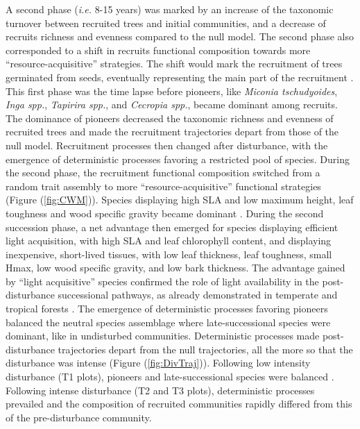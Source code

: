 \documentclass[fleqn,10pt]{ArtEcoFoG} %
\begin{document}
A second phase (\emph{i.e.} 8-15 years) was marked by an increase of the
taxonomic turnover between recruited trees and initial communities, and
a decrease of recruits richness and evenness compared to the null model.
The second phase also corresponded to a shift in recruits functional
composition towards more ``resource-acquisitive'' strategies. The shift
would mark the recruitment of trees germinated from seeds, eventually
representing the main part of the recruitment \citep{Lawton1988}. This
first phase was the time lapse before pioneers, like \emph{Miconia
tschudyoides}, \emph{Inga spp.}, \emph{Tapirira spp.}, and
\emph{Cecropia spp.}, became dominant among recruits. The dominance of
pioneers decreased the taxonomic richness and evenness of recruited
trees and made the recruitment trajectories depart from those of the
null model. Recruitment processes then changed after disturbance, with
the emergence of deterministic processes favoring a restricted pool of
species. During the second phase, the recruitment functional composition
switched from a random trait assembly to more ``resource-acquisitive''
functional strategies (Figure (\ref{fig:CWM})). Species displaying high
SLA and low maximum height, leaf toughness and wood specific gravity
became dominant \citep{Wright2004, Chave2009b, Herault2011}. During the
second succession phase, a net advantage then emerged for species
displaying efficient light acquisition, with high SLA and leaf
chlorophyll content, and displaying inexpensive, short-lived tissues,
with low leaf thickness, leaf toughness, small Hmax, low wood specific
gravity, and low bark thickness. The advantage gained by ``light
acquisitive'' species confirmed the role of light availability in the
post-disturbance successional pathways, as already demonstrated in
temperate and tropical forests
\citep{Pena2008, Carreno2012, Kunstler2016, Both2019}. The emergence of
deterministic processes favoring pioneers balanced the neutral species
assemblage where late-successional species were dominant, like in
undisturbed communities. Deterministic processes made post-disturbance
trajectories depart from the null trajectories, all the more so that the
disturbance was intense (Figure (\ref{fig:DivTraj})). Following low
intensity disturbance (T1 plots), pioneers and late-successional species
were balanced \citep{Bongers2009}. Following intense disturbance (T2 and
T3 plots), deterministic processes prevailed and the composition of
recruited communities rapidly differed from this of the pre-disturbance
community.
\end{document}
